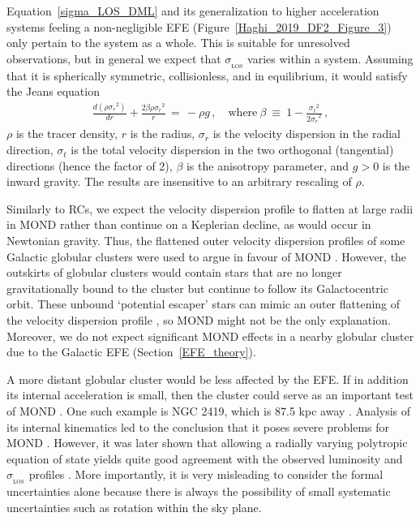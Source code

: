 \documentclass[fleqn,usenatbib,useAMS]{mnras} %
\begin{document}
Equation~\ref{sigma_LOS_DML} and its generalization to higher acceleration systems feeling a non-negligible EFE (Figure~\ref{Haghi_2019_DF2_Figure_3}) only pertain to the system as a whole. This is suitable for unresolved observations, but in general we expect that $\sigma_{_\text{LOS}}$ varies within a system. Assuming that it is spherically symmetric, collisionless, and in equilibrium, it would satisfy the Jeans equation
\begin{eqnarray}
	\frac{d\left( \rho {\sigma_r}^2 \right)}{dr} + \frac{2\beta\rho{\sigma_r}^2}{r} \, = \, -\rho g \, , \quad \text{where} ~ \beta ~\equiv~ 1 - \frac{{\sigma_t}^2}{{2\sigma_r}^2} \, ,
	\label{Jeans_equation_spherical}
\end{eqnarray}
$\rho$ is the tracer density, $r$ is the radius, $\sigma_r$ is the velocity dispersion in the radial direction, $\sigma_t$ is the total velocity dispersion in the two orthogonal (tangential) directions (hence the factor of 2), $\beta$ is the anisotropy parameter, and $g > 0$ is the inward gravity. The results are insensitive to an arbitrary rescaling of $\rho$.

Similarly to RCs, we expect the velocity dispersion profile to flatten at large radii in MOND rather than continue on a Keplerian decline, as would occur in Newtonian gravity. Thus, the flattened outer velocity dispersion profiles of some Galactic globular clusters were used to argue in favour of MOND \citep{Hernandez_2013, Durazo_2017}. However, the outskirts of globular clusters would contain stars that are no longer gravitationally bound to the cluster but continue to follow its Galactocentric orbit. These unbound `potential escaper' stars can mimic an outer flattening of the velocity dispersion profile \citep{Claydon_2017}, so MOND might not be the only explanation. Moreover, we do not expect significant MOND effects in a nearby globular cluster due to the Galactic EFE (Section~\ref{EFE_theory}).

A more distant globular cluster would be less affected by the EFE. If in addition its internal acceleration is small, then the cluster could serve as an important test of MOND \citep{Haghi_2009, Haghi_2011}. One such example is NGC 2419, which is 87.5 kpc away \citep{Di_Criscienzo_2011}. Analysis of its internal kinematics led to the conclusion that it poses severe problems for MOND \citep{Ibata_2011a, Ibata_2011b}. However, it was later shown that allowing a radially varying polytropic equation of state yields quite good agreement with the observed luminosity and $\sigma_{_\text{LOS}}$ profiles \citep{Sanders_2012a, Sanders_2012b}. More importantly, it is very misleading to consider the formal uncertainties alone because there is always the possibility of small systematic uncertainties such as rotation within the sky plane.
\end{document}
